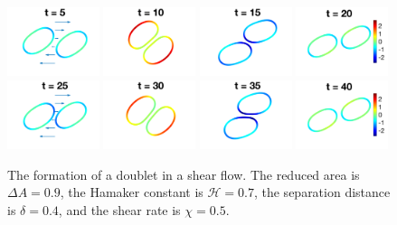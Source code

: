 \documentclass[prf,superscriptaddress,showkeys]{revtex4-1}
\begin{document}
\begin{figure}[htp]
  \includegraphics[width=0.24\textwidth]{figs/adR4em1adS7em1Chi5em1_ra090_image01.png}
  \includegraphics[width=0.24\textwidth]{figs/adR4em1adS7em1Chi5em1_ra090_image02.png}
  \includegraphics[width=0.24\textwidth]{figs/adR4em1adS7em1Chi5em1_ra090_image03.png}
  \includegraphics[width=0.24\textwidth]{figs/adR4em1adS7em1Chi5em1_ra090_image04.png}
  \includegraphics[width=0.24\textwidth]{figs/adR4em1adS7em1Chi5em1_ra090_image05.png}
  \includegraphics[width=0.24\textwidth]{figs/adR4em1adS7em1Chi5em1_ra090_image06.png}
  \includegraphics[width=0.24\textwidth]{figs/adR4em1adS7em1Chi5em1_ra090_image07.png}
  \includegraphics[width=0.24\textwidth]{figs/adR4em1adS7em1Chi5em1_ra090_image08.png}
  \caption{\label{fig:doublet090-weakAdhesion} The formation of a
  doublet in a shear flow.  The reduced area is $\Delta A = 0.9$, the
  Hamaker constant is $\mathcal{H}=0.7$, the separation distance is
  $\delta = 0.4$, and the shear rate is $\chi=0.5$.}
\end{figure}
\end{document}
